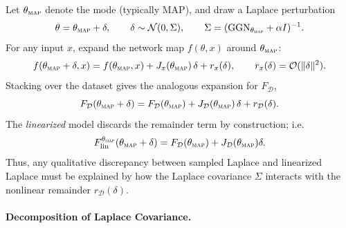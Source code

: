 Let $\theta_{\textsc{map}}$ denote the mode (typically MAP), and draw a Laplace perturbation
\[
\theta=\theta_{\textsc{map}}+\delta,
\qquad
\delta \sim \mathcal{N}(0,\Sigma),
\qquad
\Sigma=(\mathrm{GGN}_{\theta_{\textsc{map}}}+\alpha I)^{-1}.
\]
For any input $x$, expand the network map $f(\theta,x)$ around $\theta_{\textsc{map}}$:
\begin{equation}
\label{eq:taylor_single_x}
f(\theta_{\textsc{map}}+\delta,x)
=
f(\theta_{\textsc{map}},x)
+
J_x(\theta_{\textsc{map}})\,\delta
+
r_x(\delta),
\qquad
r_x(\delta)=\mathcal{O}(\|\delta\|^2).
\end{equation}
Stacking over the dataset gives the analogous expansion for $F_{\mathcal{D}}$,
\begin{equation}
\label{eq:taylor_dataset}
F_{\mathcal{D}}(\theta_{\textsc{map}}+\delta)
=
F_{\mathcal{D}}(\theta_{\textsc{map}})
+
J_{\mathcal{D}}(\theta_{\textsc{map}})\,\delta
+
r_{\mathcal{D}}(\delta).
\end{equation}
The \emph{linearized} model discards the remainder term by construction; i.e.
\[
F^{\theta_{\textsc{map}}}_{\mathrm{lin}}(\theta_{\textsc{map}}+\delta)
=
F_{\mathcal{D}}(\theta_{\textsc{map}}) + J_{\mathcal{D}}(\theta_{\textsc{map}})\delta.
\]
Thus, any qualitative discrepancy between sampled Laplace and linearized Laplace must be explained by
how the Laplace covariance $\Sigma$ interacts with the nonlinear remainder $r_{\mathcal{D}}(\delta)$.

\paragraph{Decomposition of Laplace Covariance.}

